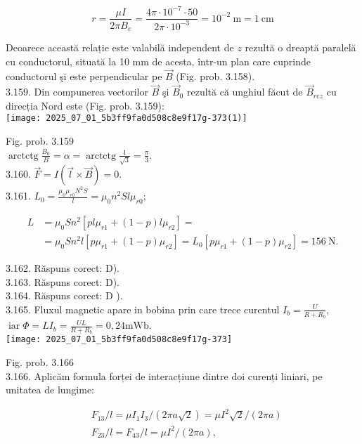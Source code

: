 $$
r=\frac{\mu I}{2 \pi B_{e}}=\frac{4 \pi \cdot 10^{-7} \cdot 50}{2 \pi \cdot 10^{-3}}=10^{-2} \mathrm{~m}=1 \mathrm{~cm}
$$

Deoarece această relație este valabilă independent de $z$ rezultă o dreaptă paralelă cu conductorul, situată la 10 mm de acesta, într-un plan care cuprinde conductorul şi este perpendicular pe $\vec{B}$ (Fig. prob. 3.158).\\
3.159. Din compunerea vectorilor $\vec{B}$ şi $\vec{B}_{0}$ rezultă că unghiul făcut de $\vec{B}_{r e z}$ cu direcția Nord este (Fig. prob. 3.159):\\
\texttt{[image: 2025\_07\_01\_5b3ff9fa0d508c8e9f17g-373(1)]}

Fig. prob. 3.159\\
$\operatorname{arctctg} \frac{B_{0}}{B}=\alpha=\operatorname{arctctg} \frac{1}{\sqrt{3}}=\frac{\pi}{3}$.\\
3.160. $\vec{F}=I(\vec{l} \times \vec{B})=0$.\\
3.161. $L_{0}=\frac{\mu_{0} \mu_{r 0} N^{2} S}{l}=\mu_{0} n^{2} S l \mu_{r 0}$;

$$
\begin{aligned}
L & =\mu_{0} S n^{2}\left[p l \mu_{r 1}+(1-p) l \mu_{r 2}\right]= \\
& =\mu_{0} S n^{2} l\left[p \mu_{r 1}+(1-p) \mu_{r 2}\right]=L_{0}\left[p \mu_{r 1}+(1-p) \mu_{r 2}\right]=156 \mathrm{~N} .
\end{aligned}
$$

3.162. Răspuns corect: D).\\
3.163. Răspuns corect: D).\\
3.164. Răspuns corect: D ).\\
3.165. Fluxul magnetic apare in bobina prin care trece curentul $I_{b}=\frac{U}{R+R_{b}}$, $\operatorname{iar} \Phi=L I_{b}=\frac{U L}{R+R_{b}}=0,24 \mathrm{mWb}$.\\
\texttt{[image: 2025\_07\_01\_5b3ff9fa0d508c8e9f17g-373]}

Fig. prob. 3.166\\
3.166. Aplicăm formula forței de interacțiune dintre doi curenți liniari, pe unitatea de lungime:

$$
\begin{aligned}
& F_{13} / l=\mu I_{1} I_{3} /(2 \pi a \sqrt{2})=\mu I^{2} \sqrt{2} /(2 \pi a) \\
& F_{23} / l=F_{43} / l=\mu I^{2} /(2 \pi a),
\end{aligned}
$$

